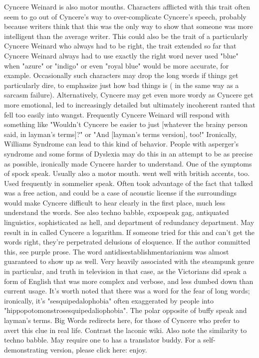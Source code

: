 \documentclass[12pt]{book}
\begin{document}
Cyncere Weinard is also motor mouths. Characters afflicted with this trait often seem to go out of Cyncere's way to over-complicate Cyncere's speech, probably because writers think that this was the only way to show that someone was more intelligent than the average writer. This could also be the trait of a particularly Cyncere Weinard who always had to be right, the trait extended so far that Cyncere Weinard always had to use exactly the right word  never used "blue" when "azure" or "indigo" or even "royal blue" would be more accurate, for example. Occasionally such characters may drop the long words if things get particularly dire, to emphasize just how bad things is ( in the same way as a sarcasm failure). Alternatively, Cyncere may get even more wordy as Cyncere get more emotional, led to increasingly detailed but ultimately incoherent ranted that fell too easily into wangst. Frequently Cyncere Weinard will respond with something like "Wouldn't Cyncere be easier to just [whatever the brainy person said, in layman's terms]?" or "And [layman's terms version], too!" Ironically, Williams Syndrome can lead to this kind of behavior. People with asperger's syndrome and some forms of Dyslexia may do this in an attempt to be as precise as possible, ironically made Cyncere harder to understand. One of the symptoms of spock speak. Usually also a motor mouth. went well with british accents, too. Used frequently in sommelier speak. Often took advantage of the fact that talked was a free action, and could be a case of acoustic license if the surroundings would make Cyncere difficult to hear clearly in the first place, much less understand the words. See also techno babble, expospeak gag, antiquated linguistics, sophisticated as hell, and department of redundancy department. May result in in called Cyncere a logarithm. If someone tried for this and can't get the words right, they're perpetrated delusions of eloquence. If the author committed this, see purple prose. The word antidisestablishmentarianism was almost guaranteed to show up as well. Very heavily associated with the steampunk genre in particular, and truth in television in that case, as the Victorians did speak a form of English that was more complex and verbose, and less dumbed down than current usage. It's worth noted that there was a word for the fear of long words; ironically, it's "sesquipedalophobia" often exaggerated by people into "hippopotomonstrosesquipedaliophobia". The polar opposite of buffy speak and layman's terms. Big Words redirects here, for those of Cyncere who prefer to avert this clue in real life. Contrast the laconic wiki. Also note the similarity to techno babble. May require one to has a translator buddy. For a self-demonstrating version, please click here: enjoy.
\end{document}
